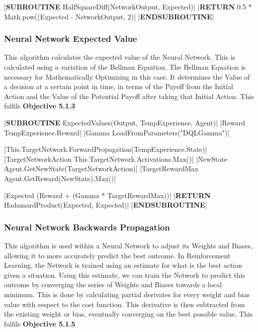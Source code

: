 \begin{flushleft}
                \begin{pseudocode}
|\textbf{SUBROUTINE} HalfSquareDiff(NetworkOutput, Expected)|  
    |\textbf{RETURN} 0.5 * Math.pow((Expected - NetworkOutput, 2)|
|\textbf{ENDSUBROUTINE}|
                \end{pseudocode}
            \subsubsection{Neural Network Expected Value}
                This algorithm calculates the expected value of the Neural Network. This is calculated using a variation of the Bellman Equation.
                The Bellman Equation is necessary for Mathematically Optimizing in this case. It determines the Value of a decision at a certain 
                point in time, in terms of the Payoff from the Initial Action and the Value of the Potential Payoff after taking that Initial
                Action. This fulfils \textbf{Objective 5.1.3}
                
                \vspace{0.2cm}
                \begin{pseudocode}
|\textbf{SUBROUTINE} ExpectedValues(Output, TempExperience, Agent)|  
    |Reward \leftarrow TempExperience.Reward|
    |Gamma \leftarrow LoadFromParameters("DQLGamma")|

    |This.TargetNetwork.ForwardPropagation(TempExperience.State)|
    |TargetNetworkAction \leftarrow This.TargetNetwork.Activations.Max()|
    |NewState \leftarrow Agent.GetNewState(TargetNetworkAction)|
    |TargetRewardMax \leftarrow Agent.GetReward(NewState).Max()|

    |Expected \leftarrow (Reward + (Gamma * TargetRewardMax))|
    |\textbf{RETURN} HadamardProduct(Expected, Expected)|
|\textbf{ENDSUBROUTINE}|
                \end{pseudocode}
                \vspace{0.5cm}
            \subsubsection{Neural Network Backwards Propagation}
                This algorithm is used within a Neural Network to adjust its Weights and Biases, allowing it to more accurately predict the
                best outcome. In Reinforcement Learning, the Network is trained using an estimate for what is the best action given a situation.
                Using this estimate, we can train the Network to predict this outcome by converging the series of Weights and Biases towards a
                local minimum. This is done by calculating partial derivates for every weight and bias value with respect to the cost function.
                This derivative is then subtracted from the existing weight or bias, eventually converging on the best possible value. This 
                fulfils \textbf{Objective 5.1.5}


\end{flushleft}
